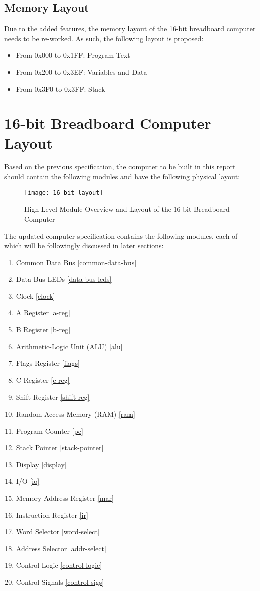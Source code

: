 \subsection{Memory Layout}
Due to the added features, the memory layout of the 16-bit breadboard computer needs to be re-worked. As such, the following
layout is proposed:
\begin{itemize}
  \item From 0x000 to 0x1FF: Program Text
  \item From 0x200 to 0x3EF: Variables and Data
  \item From 0x3F0 to 0x3FF: Stack
\end{itemize}

\section{16-bit Breadboard Computer Layout}
Based on the previous specification, the computer to be built in this report should contain the following modules and
have the following physical layout:

\begin{figure}[h]
  \centering
  \texttt{[image: 16-bit-layout]}
  \caption{High Level Module Overview and Layout of the 16-bit Breadboard Computer}
  \label{16-bit-layout}
\end{figure}
\clearpage

The updated computer specification contains the following modules, each of which will be followingly discussed in later sections:
\begin{enumerate}
  \item Common Data Bus \ref{common-data-bus}
  \item Data Bus LEDs \ref{data-bus-leds}
  \item Clock \ref{clock}
  \item A Register \ref{a-reg}
  \item B Register \ref{b-reg}
  \item Arithmetic-Logic Unit (ALU) \ref{alu}
  \item Flags Register \ref{flags}
  \item C Register \ref{c-reg}
  \item Shift Register \ref{shift-reg}
  \item Random Access Memory (RAM) \ref{ram}
  \item Program Counter \ref{pc}
  \item Stack Pointer \ref{stack-pointer}
  \item Display \ref{display}
  \item I/O \ref{io}
  \item Memory Address Register \ref{mar}
  \item Instruction Register \ref{ir}
  \item Word Selector \ref{word-select}
  \item Address Selector \ref{addr-select}
  \item Control Logic \ref{control-logic}
  \item Control Signals \ref{control-sigs}
  \label{module-list}
\end{enumerate}

